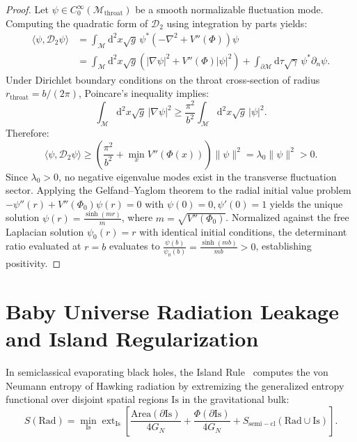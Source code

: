 \documentclass[11pt,a4paper,reqno]{article}
\theoremstyle{plain}
\theoremstyle{definition}
\theoremstyle{remark}
\numberwithin{equation}{section}
\newcommand{\diff}{\mathrm{d}}
\begin{document}
\begin{proof}
Let $\psi \in C_0^\infty(\mathcal{M}_{\mathrm{throat}})$ be a smooth normalizable fluctuation mode. Computing the quadratic form of $\mathcal{D}_2$ using integration by parts yields:
\begin{align}
  \langle \psi, \mathcal{D}_2 \psi \rangle &= \int_{\mathcal{M}} \diff^2 x \sqrt{g} \, \psi^* \left( -\nabla^2 + V''(\Phi) \right) \psi \nonumber\\
  &= \int_{\mathcal{M}} \diff^2 x \sqrt{g} \left( |\nabla \psi|^2 + V''(\Phi) |\psi|^2 \right) + \int_{\partial\mathcal{M}} \diff\tau \sqrt{\gamma} \, \psi^* \partial_n \psi.
\end{align}
Under Dirichlet boundary conditions on the throat cross-section of radius $r_{\mathrm{throat}} = b / (2\pi)$, Poincare's inequality implies:
\begin{equation}
  \int_{\mathcal{M}} \diff^2 x \sqrt{g} \, |\nabla \psi|^2 \ge \frac{\pi^2}{b^2} \int_{\mathcal{M}} \diff^2 x \sqrt{g} \, |\psi|^2.
\end{equation}
Therefore:
\begin{equation}
  \langle \psi, \mathcal{D}_2 \psi \rangle \ge \left( \frac{\pi^2}{b^2} + \min_{x} V''(\Phi(x)) \right) \|\psi\|^2 = \lambda_0 \|\psi\|^2 > 0.
\end{equation}
Since $\lambda_0 > 0$, no negative eigenvalue modes exist in the transverse fluctuation sector. Applying the Gelfand--Yaglom theorem to the radial initial value problem $-\psi''(r) + V''(\Phi_0)\psi(r) = 0$ with $\psi(0) = 0, \psi'(0) = 1$ yields the unique solution $\psi(r) = \frac{\sinh(m r)}{m}$, where $m = \sqrt{V''(\Phi_0)}$. Normalized against the free Laplacian solution $\psi_0(r) = r$ with identical initial conditions, the determinant ratio evaluated at $r = b$ evaluates to $\frac{\psi(b)}{\psi_0(b)} = \frac{\sinh(m b)}{m b} > 0$, establishing positivity.
\end{proof}

\section{Baby Universe Radiation Leakage and Island Regularization}
\label{sec:islands}

In semiclassical evaporating black holes, the Island Rule~\cite{AlmheiriHartmanMaldacena2020} computes the von Neumann entropy of Hawking radiation by extremizing the generalized entropy functional over disjoint spatial regions $\mathrm{Is}$ in the gravitational bulk:
\begin{equation}
  S(\mathrm{Rad}) = \min_{\mathrm{Is}} \operatorname{ext}_{\mathrm{Is}} \left[ \frac{\mathrm{Area}(\partial \mathrm{Is})}{4 G_N} + \frac{\Phi(\partial \mathrm{Is})}{4 G_N} + S_{\mathrm{semi-cl}}(\mathrm{Rad} \cup \mathrm{Is}) \right].
  \label{eq:island_rule}
\end{equation}
\end{document}
